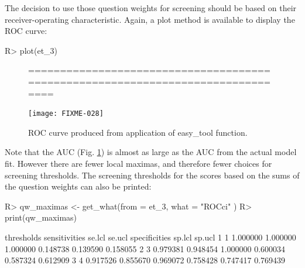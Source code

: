 \documentclass[11pt]{report}
\renewenvironment{Schunk}{\vspace{\topsep}}{\vspace{\topsep}}
\begin{document}
The decision to use those question weights for screening should be
based on their receiver-operating characteristic. Again, a plot method
is available to display the ROC curve:
\begin{Schunk}
\begin{Sinput}
R> plot(et_3)
\end{Sinput}
\end{Schunk}
\begin{figure}[!h]
  \begin{center}
\begin{Schunk}
\begin{Soutput}
================================================================================
\end{Soutput}
\end{Schunk}
\texttt{[image: FIXME-028]}
\caption{ROC curve produced from application of \textsf{easy\_tool}
  function.}
\label{fig:f4}
\end{center}
\end{figure}
Note that the AUC (Fig. \ref{fig:f4}) is almost as large as the AUC
from the actual model fit. However there are fewer local maximas, and
therefore fewer choices for screening thresholds. The screening
thresholds for the scores based on the sums of the question weights
can also be printed:
\begin{Schunk}
\begin{Sinput}
R> qw_maximas <- get_what(from = et_3,  what = "ROCci" )
R> print(qw_maximas)
\end{Sinput}
\begin{Soutput}
  thresholds sensitivities   se.lcl   se.ucl specificities   sp.lcl   sp.ucl
1          1      1.000000 1.000000 1.000000      0.148738 0.139590 0.158055
2          3      0.979381 0.948454 1.000000      0.600034 0.587324 0.612909
3          4      0.917526 0.855670 0.969072      0.758428 0.747417 0.769439
\end{Soutput}
\end{Schunk}
\end{document}
